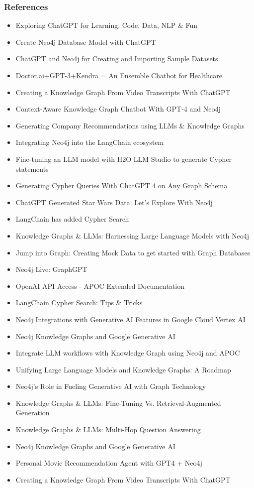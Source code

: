 \begin{frame}[fragile]\frametitle{References}
\begin{itemize}
\item Exploring ChatGPT for Learning, Code, Data, NLP \& Fun
\item Create Neo4j Database Model with ChatGPT
\item ChatGPT and Neo4j for Creating and Importing Sample Datasets
\item Doctor.ai+GPT-3+Kendra = An Ensemble Chatbot for Healthcare
\item Creating a Knowledge Graph From Video Transcripts With ChatGPT
\item Context-Aware Knowledge Graph Chatbot With GPT-4 and Neo4j
\item Generating Company Recommendations using LLMs \& Knowledge Graphs
\item Integrating Neo4j into the LangChain ecosystem
\item Fine-tuning an LLM model with H2O LLM Studio to generate Cypher statements
\item Generating Cypher Queries With ChatGPT 4 on Any Graph Schema
\item ChatGPT Generated Star Wars Data: Let's Explore With Neo4j
\item LangChain has added Cypher Search
\item Knowledge Graphs \& LLMs: Harnessing Large Language Models with Neo4j
\item Jump into Graph: Creating Mock Data to get started with Graph Databases
\item Neo4j Live: GraphGPT
\item OpenAI API Access - APOC Extended Documentation
\item LangChain Cypher Search: Tips \& Tricks
\item Neo4j Integrations with Generative AI Features in Google Cloud Vertex AI
\item Neo4j Knowledge Graphs and Google Generative AI
\item Integrate LLM workflows with Knowledge Graph using Neo4j and APOC
\item Unifying Large Language Models and Knowledge Graphs: A Roadmap
\item Neo4j’s Role in Fueling Generative AI with Graph Technology
\item Knowledge Graphs \& LLMs: Fine-Tuning Vs. Retrieval-Augmented Generation
\item Knowledge Graphs \& LLMs: Multi-Hop Question Answering
\item Neo4j Knowledge Graphs and Google Generative AI
\item Personal Movie Recommendation Agent with GPT4 + Neo4j
\item Creating a Knowledge Graph From Video Transcripts With ChatGPT
\end{itemize}
\end{frame}